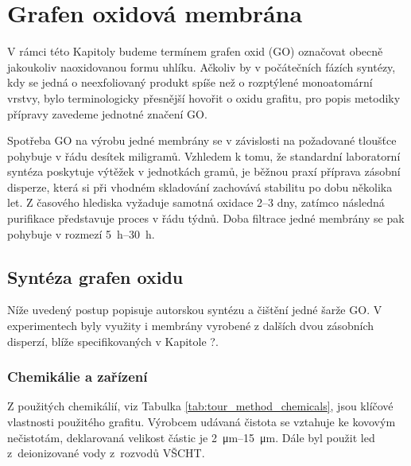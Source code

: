 \section{Grafen oxidová membrána}\label{s:grafen_oxidova_membrana}
V rámci této Kapitoly budeme termínem grafen oxid (GO) označovat obecně jakoukoliv naoxidovanou formu uhlíku. Ačkoliv by v počátečních fázích syntézy, kdy se jedná o neexfoliovaný produkt spíše než o rozptýlené monoatomární vrstvy, bylo terminologicky přesnější hovořit o oxidu grafitu, pro popis metodiky přípravy zavedeme jednotné značení GO. 

Spotřeba GO na výrobu jedné membrány se v závislosti na požadované tloušťce pohybuje v řádu desítek miligramů. Vzhledem k tomu, že standardní laboratorní syntéza poskytuje výtěžek v jednotkách gramů, je běžnou praxí příprava zásobní disperze, která si při vhodném skladování zachovává stabilitu po dobu několika let. Z časového hlediska vyžaduje samotná oxidace \numrange{2}{3} dny, zatímco následná purifikace představuje proces v řádu týdnů. Doba filtrace jedné membrány se pak pohybuje v rozmezí \qtyrange{5}{30}{\hour}.

\subsection{Syntéza grafen oxidu}\label{ss:synteza_grafen_oxidu}
Níže uvedený postup popisuje autorskou syntézu a čištění jedné šarže GO. V experimentech byly využity i membrány vyrobené z dalších dvou zásobních disperzí, blíže specifikovaných v Kapitole ?.

\subsubsection{Chemikálie a zařízení}\label{sss:chemikalie_a_zarizeni}
Z použitých chemikálií, viz Tabulka \ref{tab:tour_method_chemicals}, jsou klíčové vlastnosti použitého grafitu. Výrobcem udávaná čistota se vztahuje ke kovovým nečistotám, deklarovaná velikost částic je \qtyrange{2}{15}{\micro\meter}. Dále byl použit led z~deionizované vody z~rozvodů VŠCHT.

